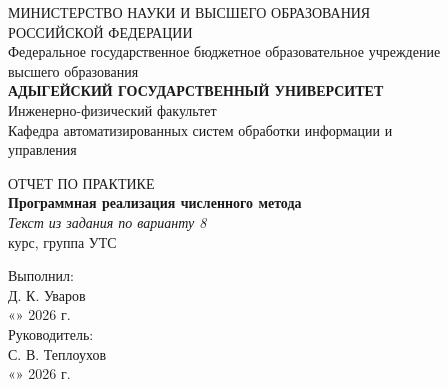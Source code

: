 \documentclass[12pt,a4paper]{article}
\begin{document}
\pagestyle{empty}
\begin{center}
    {\fontsize{12pt}{14pt}\selectfont
        МИНИСТЕРСТВО НАУКИ И ВЫСШЕГО ОБРАЗОВАНИЯ\\
        РОССИЙСКОЙ ФЕДЕРАЦИИ\\
        Федеральное государственное бюджетное образовательное учреждение\\
        высшего образования\\
        \textbf{АДЫГЕЙСКИЙ ГОСУДАРСТВЕННЫЙ УНИВЕРСИТЕТ}\\
    }
    \vspace{0.3cm}
    {\fontsize{12pt}{14pt}\selectfont
        Инженерно-физический факультет\\
        Кафедра автоматизированных систем обработки информации и\\
        управления\\
    }
\end{center}
\vspace{4.5cm}
\begin{center}
    {\fontsize{14pt}{16pt}\selectfont ОТЧЕТ ПО ПРАКТИКЕ\\}
    \vspace{0.5cm}
    {\fontsize{16pt}{18pt}\selectfont \textbf{Программная реализация численного метода}\\}
    {\fontsize{14pt}{16pt}\selectfont \textit{Текст из задания по варианту 8}\\}
    \vspace{0.8cm}
    {\fontsize{12pt}{14pt} курс, группа УТС\\}
\end{center}
\vspace{3cm}
\hfill
\begin{minipage}{0.48\textwidth}
    {\normalsize Выполнил:\\
    \underline{\hspace{3.5cm}} Д. К. Уваров\\
    «\underline{\hspace{0.8cm}}» \underline{\hspace{2.2cm}} 2026 г.\\
    \vspace{0.5cm}
    Руководитель:\\
    \underline{\hspace{3.5cm}} С. В. Теплоухов\\
    «\underline{\hspace{0.8cm}}» \underline{\hspace{2.2cm}} 2026 г.}
\end{minipage}
\end{document}
